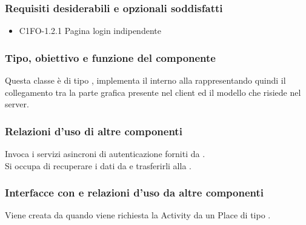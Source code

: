 \subsubsection*{Requisiti desiderabili e opzionali soddisfatti}
\begin{itemize}
    \item C1FO-1.2.1 Pagina login indipendente
\end{itemize}
\subsubsection*{Tipo, obiettivo e funzione del componente}
Questa classe \`e di tipo , implementa il 
interno alla  rappresentando quindi il collegamento tra la parte
grafica presente nel client ed il modello che risiede nel server.
\subsubsection*{Relazioni d'uso di altre componenti} Invoca i servizi
asincroni di autenticazione forniti da .\\ Si occupa di
recuperare i dati da  e trasferirli alla . 
\subsubsection*{Interfacce con e relazioni d'uso da altre componenti} 
Viene creata da  quando viene richiesta la Activity da
un Place di tipo .
